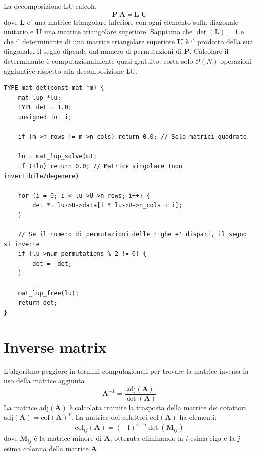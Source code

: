 \documentclass[10pt]{article}
\begin{document}
La decomposizione LU calcola
$$ \mathbf{P} \; \mathbf{A} = \mathbf{L} \; \mathbf{U} $$
dove $\mathbf{L}$ e' una matrice triangolare inferiore con ogni elemento sulla diagonale unitario e $\mathbf{U}$ una matrice triangolare superiore.
Sappiamo che $\det(\mathbf{L})=1$ e che il determinante di una matrice triangolare superiore $\mathbf{U}$ è il prodotto della sua diagonale. Il segno dipende dal numero di permutazioni di $\mathbf{P}$.
Calcolare il determinante è computazionalmente quasi gratuito: costa solo $\mathcal{O}(N)$ operazioni aggiuntive rispetto alla decomposizione LU.
\begin{lstlisting}
TYPE mat_det(const mat *m) {
    mat_lup *lu;
    TYPE det = 1.0;
    unsigned int i;
    
    if (m->n_rows != m->n_cols) return 0.0; // Solo matrici quadrate
    
    lu = mat_lup_solve(m);
    if (!lu) return 0.0; // Matrice singolare (non invertibile/degenere)
    
    for (i = 0; i < lu->U->n_rows; i++) {
        det *= lu->U->data[i * lu->U->n_cols + i];
    }
    
    // Se il numero di permutazioni delle righe e' dispari, il segno si inverte
    if (lu->num_permutations % 2 != 0) {
        det = -det;
    }
    
    mat_lup_free(lu);
    return det;
}
\end{lstlisting}










\section{Inverse matrix}

L'algoritmo peggiore in termini computazionali per trovare la matrice inversa fa uso della matrice aggiunta
\begin{equation}
\mathbf{A}^{-1} = \frac{\text{adj}(\mathbf{A})}{\det(\mathbf{A})}
\end{equation}
La matrice $\text{adj}(\mathbf{A})$ è calcolata tramite la trasposta della matrice dei cofattori $\text{adj}(\mathbf{A}) = \text{cof}(\mathbf{A})^T$. La matrice dei cofattori $\text{cof}(\mathbf{A})$ ha elementi:
\begin{equation}
\text{cof}_{ij}(\mathbf{A}) = (-1)^{i+j} \det\left(\mathbf{M}_{ij}\right)
\end{equation}
dove $\mathbf{M}_{ij}$ è la matrice minore di $\mathbf{A}$, ottenuta eliminando la $i$-esima riga e la $j$-esima colonna della matrice $\mathbf{A}$.
\end{document}
